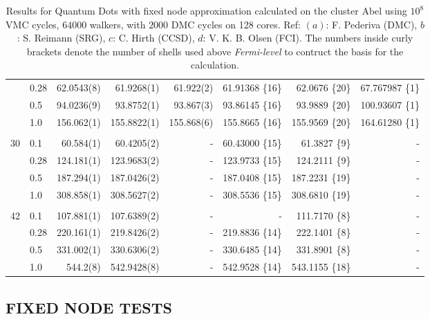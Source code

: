 \begin{table}
\begin{center}
\begin{tabular}{rl|rrrrrr}
          &   0.28   &  62.0543(8)  &  61.9268(1) & 61.922(2) &61.91368 \{16\}	& 62.0676 \{20\} & 67.767987 \{1\}\\
          &   0.5    &  94.0236(9)  &  93.8752(1) & 93.867(3) &93.86145 \{16\}	& 93.9889 \{20\} & 100.93607 \{1\}\\
          &   1.0    & 156.062(1)   & 155.8822(1) & 155.868(6)&155.8665 \{16\}	& 155.9569 \{20\}& 164.61280 \{1\}\\
\cline{2-8}
\multicolumn{8}{c}{} \\
    30    &   0.1    &  60.584(1)  &  60.4205(2)  & -		&60.43000 \{15\}	&  61.3827 \{9\}& -\\
          &   0.28   & 124.181(1)  & 123.9683(2)  & - 		&123.9733 \{15\}	& 124.2111 \{9\}& -\\
          &   0.5    & 187.294(1)  & 187.0426(2)  & - 		&187.0408 \{15\}	& 187.2231 \{19\}& -\\
          &   1.0    & 308.858(1)  & 308.5627(2)  & -	 	&308.5536 \{15\}	& 308.6810 \{19\}& -\\
\cline{2-8}
\multicolumn{8}{c}{} \\
    42    &   0.1    & 107.881(1)  & 107.6389(2)  & - 		&- 			& 111.7170 \{8\}& -\\
          &   0.28   & 220.161(1)  & 219.8426(2)  & - 		&219.8836 \{14\}	& 222.1401 \{8\}& -\\
          &   0.5    & 331.002(1)  & 330.6306(2)  & - 		&330.6485 \{14\}	& 331.8901 \{8\}& -\\
          &   1.0    & 544.2(8)    & 542.9428(8)  & - 		&542.9528 \{14\}	& 543.1155 \{18\}& -\\
\hline\hline


\end{tabular}
\caption{Results for Quantum Dots with fixed node approximation calculated on the cluster Abel using $10^8$ VMC cycles, $64000$ walkers, with $2000$ DMC cycles on 128 cores. Ref: $(a)$: F. Pederiva \cite{MagnusArticle} (DMC), $b$: S. Reimann \cite{Sarah} (SRG), $c$: C. Hirth \cite{Hirth} (CCSD), $d$: V. K. B. Olsen \cite{Olsen} (FCI). The numbers inside curly brackets denote the number of shells used above \textit{Fermi-level} to contruct the basis for the calculation.}
\label{tab:QDotsResultsAll}
\end{center}
\end{table}

\subsection{FIXED NODE TESTS}

